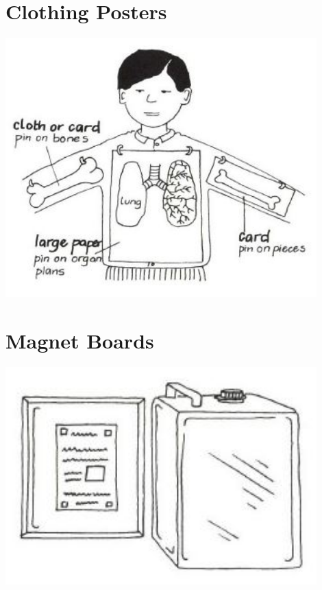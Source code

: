 
\section{Clothing Posters}

\begin{center}
\includegraphics[width=12cm]{./img/vso/clothing-poster.jpg}
\end{center}


\section{Magnet Boards}

\begin{center}
\includegraphics[width=12cm]{./img/vso/magnet-board.jpg}
\end{center}
